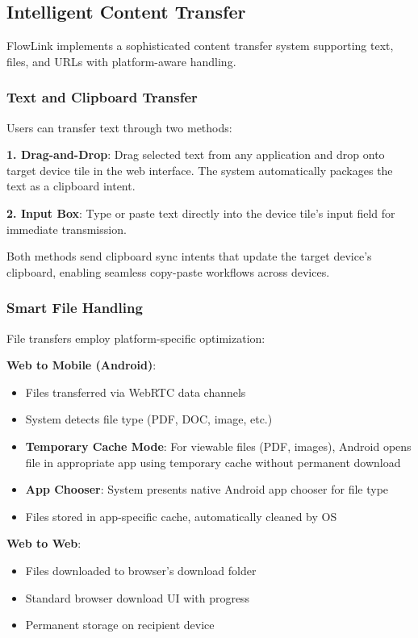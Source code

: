 \documentclass[conference]{IEEEtran}
\begin{document}
\subsection{Intelligent Content Transfer}

FlowLink implements a sophisticated content transfer system supporting text, files, and URLs with platform-aware handling.

\subsubsection{Text and Clipboard Transfer}

Users can transfer text through two methods:

\textbf{1. Drag-and-Drop}: Drag selected text from any application and drop onto target device tile in the web interface. The system automatically packages the text as a clipboard intent.

\textbf{2. Input Box}: Type or paste text directly into the device tile's input field for immediate transmission.

Both methods send clipboard sync intents that update the target device's clipboard, enabling seamless copy-paste workflows across devices.

\subsubsection{Smart File Handling}

File transfers employ platform-specific optimization:

\textbf{Web to Mobile (Android)}:
\begin{itemize}
    \item Files transferred via WebRTC data channels
    \item System detects file type (PDF, DOC, image, etc.)
    \item \textbf{Temporary Cache Mode}: For viewable files (PDF, images), Android opens file in appropriate app using temporary cache without permanent download
    \item \textbf{App Chooser}: System presents native Android app chooser for file type
    \item Files stored in app-specific cache, automatically cleaned by OS
\end{itemize}

\textbf{Web to Web}:
\begin{itemize}
    \item Files downloaded to browser's download folder
    \item Standard browser download UI with progress
    \item Permanent storage on recipient device
\end{itemize}
\end{document}
